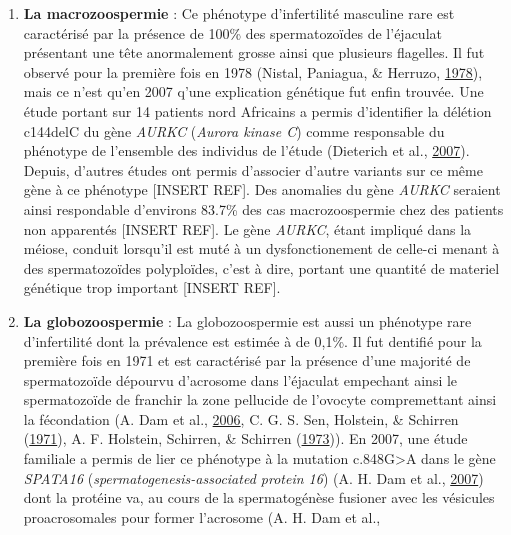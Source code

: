 \documentclass[12pt,twoside]{reedthesis}
\providecommand{\tightlist}{%
  \setlength{\itemsep}{0pt}\setlength{\parskip}{0pt}}
\theoremstyle{definition}
\theoremstyle{definition}
\theoremstyle{remark}
\begin{document}
\begin{enumerate}
    \begin{enumerate}
    \def\labelenumii{\alph{enumii}.}
    \tightlist
    \item
      \textbf{La macrozoospermie} : Ce phénotype d'infertilité masculine
      rare est caractérisé par la présence de 100\% des spermatozoïdes de
      l'éjaculat présentant une tête anormalement grosse ainsi que
      plusieurs flagelles. Il fut observé pour la première fois en 1978
      (Nistal, Paniagua, \& Herruzo,
      \protect\hyperlink{ref-Nistal}{1978}), mais ce n'est qu'en 2007
      q'une explication génétique fut enfin trouvée. Une étude portant sur
      14 patients nord Africains a permis d'identifier la délétion
      c144delC du gène \emph{AURKC} (\emph{Aurora kinase C}) comme
      responsable du phénotype de l'ensemble des individus de l'étude
      (Dieterich et al., \protect\hyperlink{ref-Dieterich2007}{2007}).
      Depuis, d'autres études ont permis d'associer d'autre variants sur
      ce même gène à ce phénotype {[}INSERT REF{]}. Des anomalies du gène
      \emph{AURKC} seraient ainsi respondable d'environs 83.7\% des cas
      macrozoospermie chez des patients non apparentés {[}INSERT REF{]}.
      Le gène \emph{AURKC}, étant impliqué dans la méiose, conduit
      lorsqu'il est muté à un dysfonctionement de celle-ci menant à des
      spermatozoïdes polyploïdes, c'est à dire, portant une quantité de
      materiel génétique trop important {[}INSERT REF{]}.\\
    \item
      \textbf{La globozoospermie} : La globozoospermie est aussi un
      phénotype rare d'infertilité dont la prévalence est estimée à de
      0,1\%. Il fut dentifié pour la première fois en 1971 et est
      caractérisé par la présence d'une majorité de spermatozoïde dépourvu
      d'acrosome dans l'éjaculat empechant ainsi le spermatozoïde de
      franchir la zone pellucide de l'ovocyte compremettant ainsi la
      fécondation (A. Dam et al., \protect\hyperlink{ref-Dam2006}{2006},
      C. G. S. Sen, Holstein, \& Schirren
      (\protect\hyperlink{ref-Sen2009}{1971}), A. F. Holstein, Schirren,
      \& Schirren (\protect\hyperlink{ref-Holstein1973}{1973})). En 2007,
      une étude familiale a permis de lier ce phénotype à la mutation
      c.848G\textgreater{}A dans le gène \emph{SPATA16}
      (\emph{spermatogenesis-associated protein 16}) (A. H. Dam et al.,
      \protect\hyperlink{ref-Dam2007a}{2007}) dont la protéine va, au
      cours de la spermatogénèse fusioner avec les vésicules
      proacrosomales pour former l'acrosome (A. H. Dam et al.,

\end{enumerate}
\end{enumerate}
\end{document}
